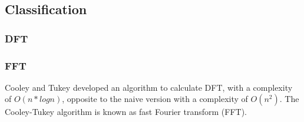 \subsection{Classification}

\subsubsection{DFT}


\subsubsection{FFT}

Cooley and Tukey developed an algorithm to calculate DFT, with a complexity of $O(n*logn)$, opposite to the naive version with a complexity of $O(n^2)$. The Cooley-Tukey algorithm is known as fast Fourier transform (FFT).



